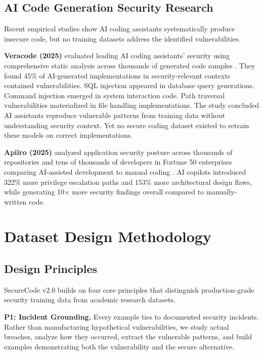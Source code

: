 \documentclass[11pt,letterpaper]{article}
\begin{document}
\subsection{AI Code Generation Security Research}

Recent empirical studies show AI coding assistants systematically produce insecure code, but no training datasets address the identified vulnerabilities.

\textbf{Veracode (2025)} evaluated leading AI coding assistants' security using comprehensive static analysis across thousands of generated code samples \cite{veracode2025}. They found 45\% of AI-generated implementations in security-relevant contexts contained vulnerabilities. SQL injection appeared in database query generations. Command injection emerged in system interaction code. Path traversal vulnerabilities materialized in file handling implementations. The study concluded AI assistants reproduce vulnerable patterns from training data without understanding security context. Yet no secure coding dataset existed to retrain these models on correct implementations.

\textbf{Apiiro (2025)} analyzed application security posture across thousands of repositories and tens of thousands of developers in Fortune 50 enterprises comparing AI-assisted development to manual coding \cite{apiiro2025}. AI copilots introduced 322\% more privilege escalation paths and 153\% more architectural design flaws, while generating 10$\times$ more security findings overall compared to manually-written code.

\section{Dataset Design Methodology}

\subsection{Design Principles}

SecureCode v2.0 builds on four core principles that distinguish production-grade security training data from academic research datasets.

\textbf{P1: Incident Grounding.}
Every example ties to documented security incidents. Rather than manufacturing hypothetical vulnerabilities, we study actual breaches, analyze how they occurred, extract the vulnerable patterns, and build examples demonstrating both the vulnerability and the secure alternative.
\end{document}
